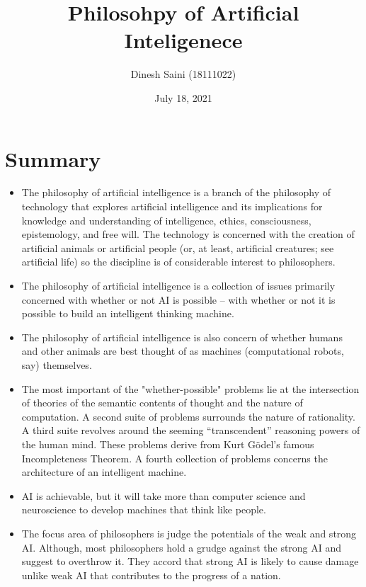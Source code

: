 \documentclass[13pt]{article}
\begin{document}
\title{Philosohpy of Artificial Inteligenece}
\author{Dinesh Saini (18111022)}
\date{July 18, 2021}
\maketitle



\section{Summary}

\begin{itemize}

\item The philosophy of artificial intelligence is a branch of the philosophy of technology that explores artificial intelligence and its implications for knowledge and understanding of intelligence, ethics, consciousness, epistemology, and free will.
The technology is concerned with the creation of artificial animals or artificial people (or, at least, artificial creatures; see artificial life) so the discipline is of considerable interest to philosophers.
\item The philosophy of artificial intelligence is a collection of issues primarily concerned with whether or not AI is possible -- with whether or not it is possible to build an intelligent thinking machine.
\item The philosophy of artificial intelligence is also concern of whether humans and other animals are best thought of as machines (computational robots, say) themselves.
\item The most important of the "whether-possible" problems lie at the intersection of theories of the semantic contents of thought and the nature of computation. A second suite of problems surrounds the nature of rationality. A third suite revolves around the seeming “transcendent” reasoning powers of the human mind. These problems derive from Kurt Gödel's famous Incompleteness Theorem. A fourth collection of problems concerns the architecture of an intelligent machine. 
\item AI is achievable, but it will take more than computer science and neuroscience to develop machines that think like people.
\item The focus area of philosophers is judge the potentials of the weak and strong AI. Although, most philosophers hold a grudge against the strong AI and suggest to overthrow it. They accord that strong AI is likely to cause damage unlike weak AI that contributes to the progress of a nation.

\end{itemize}
\end{document}
